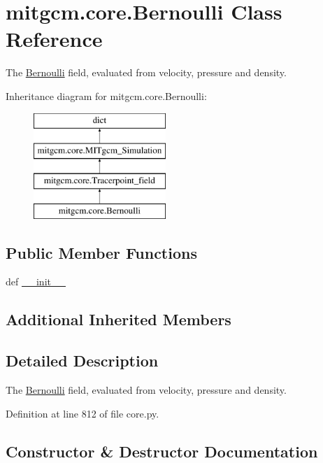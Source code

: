\hypertarget{classmitgcm_1_1core_1_1Bernoulli}{}\section{mitgcm.\+core.\+Bernoulli Class Reference}
\label{classmitgcm_1_1core_1_1Bernoulli}


The \hyperlink{classmitgcm_1_1core_1_1Bernoulli}{Bernoulli} field, evaluated from velocity, pressure and density.  


Inheritance diagram for mitgcm.\+core.\+Bernoulli\+:\begin{figure}[H]
\begin{center}
\leavevmode
\includegraphics[height=4.000000cm]{classmitgcm_1_1core_1_1Bernoulli}
\end{center}
\end{figure}
\subsection*{Public Member Functions}
\begin{DoxyCompactItemize}
\item 
def \hyperlink{classmitgcm_1_1core_1_1Bernoulli_a823e52977dd3ac349fb569eb3a4bf167}{\+\_\+\+\_\+init\+\_\+\+\_\+}
\end{DoxyCompactItemize}
\subsection*{Additional Inherited Members}


\subsection{Detailed Description}
The \hyperlink{classmitgcm_1_1core_1_1Bernoulli}{Bernoulli} field, evaluated from velocity, pressure and density. 



Definition at line 812 of file core.\+py.



\subsection{Constructor \& Destructor Documentation}
\hypertarget{classmitgcm_1_1core_1_1Bernoulli_a823e52977dd3ac349fb569eb3a4bf167}{}
